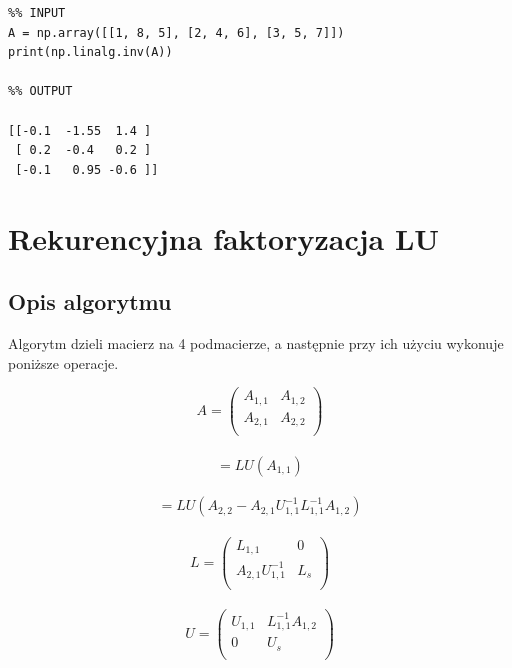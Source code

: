 \documentclass{article}
\begin{document}
\begin{lstlisting}
%% INPUT
A = np.array([[1, 8, 5], [2, 4, 6], [3, 5, 7]])
print(np.linalg.inv(A))

%% OUTPUT

[[-0.1  -1.55  1.4 ]
 [ 0.2  -0.4   0.2 ]
 [-0.1   0.95 -0.6 ]]
\end{lstlisting}

\section{Rekurencyjna faktoryzacja LU}

\subsection{Opis algorytmu}
\qquad Algorytm dzieli macierz na 4 podmacierze, a następnie przy ich użyciu wykonuje poniższe operacje.

\begin{equation}
A = 
     \begin{pmatrix}
      A_{1,1} & A_{1,2}  \\
      A_{2,1} & A_{2,2} \\
     \end{pmatrix}
\end{equation}\\
\begin{equation}
[L_{1,1}, U_{1,1}] = LU(A_{1,1})
\end{equation}\\
\begin{equation}
[L_s, U_s]
= LU(A_{2,2} - A_{2,1}U_{1,1}^{-1}L_{1,1}^{-1}A_{1,2})
\end{equation}\\
\begin{equation}
L = 
    \begin{pmatrix}
        L_{1,1} & 0  \\         A_{2,1}U_{1,1}^{-1} & L_s \\
    \end{pmatrix}
\end{equation}\\
\begin{equation}
U = 
    \begin{pmatrix}
        U_{1,1} &  L_{1,1}^{-1}A_{1,2} \\         0 & U_s \\
    \end{pmatrix}
\end{equation}
\end{document}

